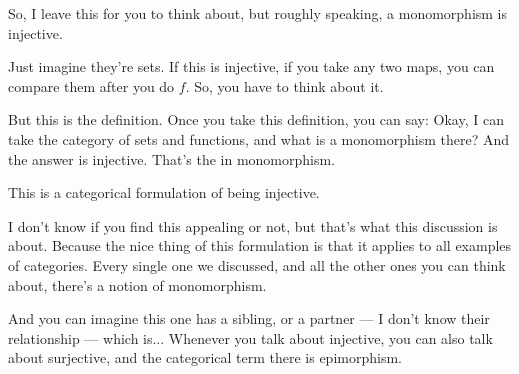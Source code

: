 \begin{speech}[00:07:22 - 00:08:27]
So, I leave this for you to think about, but roughly speaking, a monomorphism is injective. 

Just imagine they're sets. If this is injective, if you take any two maps, you can compare them after you do $f$. So, you have to think about it.

But this is the definition. Once you take this definition, you can say: Okay, I can take the category of sets and functions, and what is a monomorphism there? And the answer is injective. That's the  in monomorphism.

This is a categorical formulation of being injective.

I don't know if you find this appealing or not, but that's what this discussion is about. Because the nice thing of this formulation is that it applies to all examples of categories. Every single one we discussed, and all the other ones you can think about, there's a notion of monomorphism.

And you can imagine this one has a sibling, or a partner --- I don't know their relationship --- which is... Whenever you talk about injective, you can also talk about surjective, and the categorical term there is epimorphism.
\end{speech}

